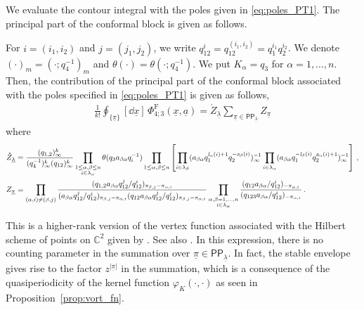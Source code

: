 We evaluate the contour integral with the poles given in \eqref{eq:poles_PT1}.
The principal part of the conformal block is given as follows.
\begin{theorem}\label{thm:vertex_Fock}
    For $i = (i_1,i_2)$ and $j = (j_1,j_2)$, we write $q_{12}^i = q_{12}^{(i_1,i_2)} = q_1^{i_1} q_2^{i_2}$.
    We denote $(\cdot)_m = (\cdot;q_4^{-1})_m$ and $\theta(\cdot) = \theta(\cdot;q_4^{-1})$.
    We put $K_\alpha = q_3$ for $\alpha = 1, \ldots, n$.
    Then, the contribution of the principal part of the conformal block associated with the poles specified in \eqref{eq:poles_PT1} is given as follows,
    \begin{align}
    \frac{1}{k!} \oint_{\{\underline{\pi}\}} [\dd{\underline{x}}] \, \Phi_{4;3}^\text{F}(\underline{x},\underline{a}) 
    = \mathring{Z}_{\underline{\lambda}} \sum_{\underline{\pi} \in \mathsf{PP}_{\underline{\lambda}}} Z_{\underline{\pi}}
    \end{align}
    where
\begin{subequations}
\begin{align}
    \mathring{Z}_{\underline{\lambda}} 
    & = \frac{(q_{1,2})_\infty^k}{(q_4^{-1})_\infty^k (q_{12})_\infty^k} \prod_{\substack{1 \le \alpha, \beta \le n \\ i \in \lambda_\alpha}} \theta(q_3 a_{\beta \alpha} q_i^{-1}) \prod_{1 \le \alpha,\beta \le n} \left[ \prod_{i \in \lambda_\beta} (a_{\beta \alpha} q_1^{\textsl{l}_\alpha(i) + 1} q_2^{-\textsl{a}_\beta(i)})^{-1}_\infty \prod_{i \in \lambda_\alpha} (a_{\beta \alpha} q_1^{-\textsl{l}_\beta(i)} q_2^{\textsl{a}_\alpha(i)+1})^{-1}_\infty \right]
    \, , \\
    Z_{\underline{\pi}} & = \prod_{(\alpha,i) \neq (\beta,j)}
    \frac{(q_{1,2} a_{\beta\alpha} q_{12}^j / q_{12}^i)_{\pi_{\beta,j}-\pi_{\alpha,i}}}{(a_{\beta\alpha} q_{12}^j / q_{12}^i)_{\pi_{\beta,j}-\pi_{\alpha,i}} (q_{12} a_{\beta\alpha} q_{12}^j / q_{12}^i)_{\pi_{\beta,j}-\pi_{\alpha,i}} } \prod_{\substack{\alpha,\beta=1,\ldots,n \\ i \in \lambda_\alpha}} \frac{(q_{12} a_{\beta\alpha} / q_{12}^{i})_{-\pi_{\alpha,i}}}{(q_{123} a_{\beta\alpha} / q_{12}^{i})_{-\pi_{\alpha,i}}}
    \, .
\end{align}    
\end{subequations}
\end{theorem}
This is a higher-rank version of the vertex function associated with the Hilbert scheme of points on $\mathbb{C}^2$ given by \cite{Smirnov:2019rmq,Crew:2020psc}.
See also \cite{Choi:2019zpz}.
In this expression, there is no counting parameter in the summation over $\underline{\pi} \in \mathsf{PP}_{\underline{\lambda}}$. 
In fact, the stable envelope gives rise to the factor $z^{|\underline{\pi}|}$ in the summation, which is a consequence of the quasiperiodicity of the kernel function $\varphi_K(\cdot,\cdot)$ as seen in Proposition~\ref{prop:vort_fn}.



